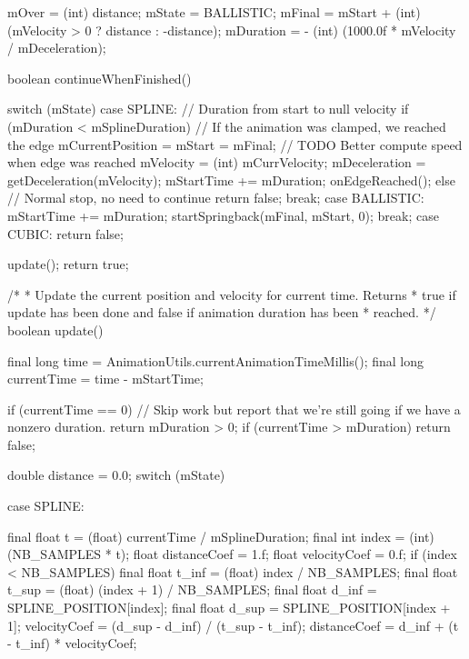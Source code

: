 {{{            mOver = (int) distance;
            mState = BALLISTIC;
            mFinal = mStart + (int) (mVelocity > 0 ? distance : -distance);
            mDuration = - (int) (1000.0f * mVelocity / mDeceleration);
        }

        boolean continueWhenFinished() {
            switch (mState) {
                case SPLINE:
                    // Duration from start to null velocity
                    if (mDuration < mSplineDuration) {
                        // If the animation was clamped, we reached the edge
                        mCurrentPosition = mStart = mFinal;
                        // TODO Better compute speed when edge was reached
                        mVelocity = (int) mCurrVelocity;
                        mDeceleration = getDeceleration(mVelocity);
                        mStartTime += mDuration;
                        onEdgeReached();
                    } else {
                        // Normal stop, no need to continue
                        return false;
                    }
                    break;
                case BALLISTIC:
                    mStartTime += mDuration;
                    startSpringback(mFinal, mStart, 0);
                    break;
                case CUBIC:
                    return false;
            }

            update();
            return true;
        }

        /*
         * Update the current position and velocity for current time. Returns
         * true if update has been done and false if animation duration has been
         * reached.
         */
        boolean update() {
            final long time = AnimationUtils.currentAnimationTimeMillis();
            final long currentTime = time - mStartTime;

            if (currentTime == 0) {
                // Skip work but report that we're still going if we have a nonzero duration.
                return mDuration > 0;
            }
            if (currentTime > mDuration) {
                return false;
            }

            double distance = 0.0;
            switch (mState) {
                case SPLINE: {
                    final float t = (float) currentTime / mSplineDuration;
                    final int index = (int) (NB_SAMPLES * t);
                    float distanceCoef = 1.f;
                    float velocityCoef = 0.f;
                    if (index < NB_SAMPLES) {
                        final float t_inf = (float) index / NB_SAMPLES;
                        final float t_sup = (float) (index + 1) / NB_SAMPLES;
                        final float d_inf = SPLINE_POSITION[index];
                        final float d_sup = SPLINE_POSITION[index + 1];
                        velocityCoef = (d_sup - d_inf) / (t_sup - t_inf);
                        distanceCoef = d_inf + (t - t_inf) * velocityCoef;
                    }

}}}}}
